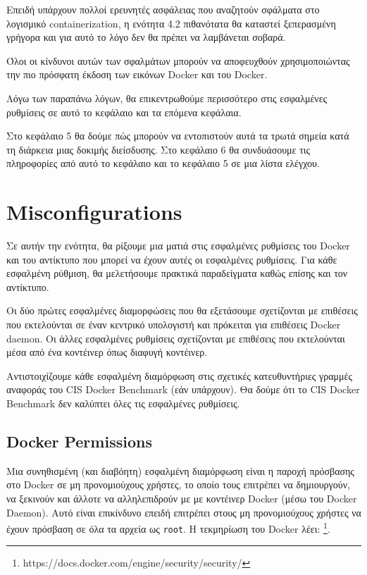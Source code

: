 Επειδή υπάρχουν πολλοί ερευνητές ασφάλειας που αναζητούν σφάλματα στο λογισμικό
\textlatin{containerization}, η ενότητα 4.2 πιθανότατα θα καταστεί ξεπερασμένη
γρήγορα και για αυτό το λόγο δεν θα πρέπει να λαμβάνεται σοβαρά.

Όλοι οι κίνδυνοι αυτών των σφαλμάτων μπορούν να αποφευχθούν χρησιμοποιώντας
την πιο πρόσφατη έκδοση των εικόνων \textlatin{Docker} και του
\textlatin{Docker}.

Λόγω των παραπάνω λόγων, θα επικεντρωθούμε περισσότερο στις εσφαλμένες
ρυθμίσεις σε αυτό το κεφάλαιο και τα επόμενα κεφάλαια.

Στο κεφάλαιο 5 θα δούμε πώς μπορούν να εντοπιστούν αυτά τα τρωτά σημεία
κατά τη διάρκεια μιας δοκιμής διείσδυσης. Στο κεφάλαιο 6 θα συνδυάσουμε τις
πληροφορίες από αυτό το κεφάλαιο και το κεφάλαιο 5 σε μια λίστα ελέγχου.

\section{\textlatin{Misconfigurations}}

Σε αυτήν την ενότητα, θα ρίξουμε μια ματιά στις εσφαλμένες ρυθμίσεις του
\textlatin{Docker} και του αντίκτυπο που μπορεί να έχουν αυτές οι εσφαλμένες
ρυθμίσεις. Για κάθε εσφαλμένη ρύθμιση, θα μελετήσουμε πρακτικά
παραδείγματα καθώς επίσης και τον αντίκτυπο.


Οι δύο πρώτες εσφαλμένες διαμορφώσεις που θα εξετάσουμε σχετίζονται με
επιθέσεις που εκτελούνται σε έναν κεντρικό υπολογιστή και πρόκειται για
επιθέσεις \textlatin{Docker daemon}. Οι άλλες εσφαλμένες ρυθμίσεις σχετίζονται
με επιθέσεις που εκτελούνται μέσα από ένα κοντέινερ όπως διαφυγή κοντέινερ.

Αντιστοιχίζουμε κάθε εσφαλμένη διαμόρφωση στις σχετικές κατευθυντήριες γραμμές
αναφοράς του \textlatin{CIS Docker Benchmark} (εάν υπάρχουν). Θα δούμε ότι το
\textlatin{CIS Docker Benchmark} δεν καλύπτει όλες τις εσφαλμένες
ρυθμίσεις.

\subsection{\textlatin{Docker Permissions}}

Μια συνηθισμένη (και διαβόητη) εσφαλμένη διαμόρφωση είναι η παροχή πρόσβασης
στο \textlatin{Docker} σε μη προνομιούχους χρήστες, το οποίο τους επιτρέπει να
δημιουργούν, να ξεκινούν και άλλοτε να αλληλεπιδρούν με 
με κοντέινερ \textlatin{Docker} (μέσω του \textlatin{Docker Daemon}). Αυτό
είναι επικίνδυνο επειδή επιτρέπει στους μη προνομιούχους χρήστες να έχουν
πρόσβαση σε όλα τα αρχεία ως \texttt{\textlatin{root}}. Η τεκμηρίωση του
\textlatin{Docker} λέει:
\footnote{\textlatin{https://docs.docker.com/engine/security/security/}}.

